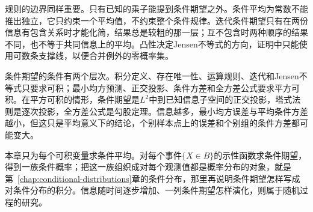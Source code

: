 规则的边界同样重要。只有已知的乘子能提到条件期望之外。条件平均为常数不能推出独立，它只约束一个平均值，不约束整个条件规律。迭代条件期望只有在两份信息有包含关系时才能化简，结果总是较粗的那一层；互不包含时两种顺序的结果不同，也不等于共同信息上的平均。凸性决定Jensen不等式的方向，证明中只能使用可数条支撑线，以便合并例外的零概率集。

条件期望的条件有两个层次。积分定义、存在唯一性、运算规则、迭代和Jensen不等式只要求可积；最小均方预测、正交投影、条件方差和全方差公式要求平方可积。在平方可积的情形，条件期望是$L^{2}$中到已知信息子空间的正交投影，塔式法则是逐次投影，全方差公式是勾股定理。信息越多，最小均方误差与平均条件方差越小，但这只是平均意义下的结论，个别样本点上的误差和个别组的条件方差都可能变大。

本章只为每个可积变量求条件平均。对每个事件$\{X\in B\}$的示性函数求条件期望，得到一族条件概率；把这一族组织成对每个观测值都是概率分布的对象，就是第~\ref{chap:conditional-distributions}章的条件分布，那里再说明条件期望怎样写成对条件分布的积分。信息随时间逐步增加、一列条件期望怎样演化，则属于随机过程的研究。
